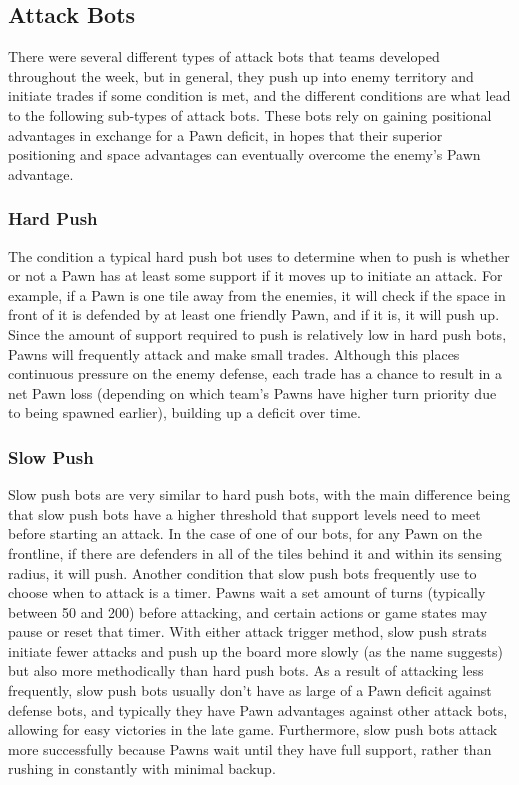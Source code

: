 \documentclass{article}
\begin{document}
\subsection{Attack Bots}
\hspace{\parindent}
There were several different types of attack bots that teams developed throughout the week, but in general, they push up into enemy territory and initiate trades if some condition is met, and the different conditions are what lead to the following sub-types of attack bots. These bots rely on gaining positional advantages in exchange for a Pawn deficit, in hopes that their superior positioning and space advantages can eventually overcome the enemy’s Pawn advantage.

\subsubsection{Hard Push}
\hspace{\parindent}
The condition a typical hard push bot uses to determine when to push is whether or not a Pawn has at least some support if it moves up to initiate an attack. For example, if a Pawn is one tile away from the enemies, it will check if the space in front of it is defended by at least one friendly Pawn, and if it is, it will push up. Since the amount of support required to push is relatively low in hard push bots, Pawns will frequently attack and make small trades. Although this places continuous pressure on the enemy defense, each trade has a chance to result in a net Pawn loss (depending on which team’s Pawns have higher turn priority due to being spawned earlier), building up a deficit over time.  

\subsubsection{Slow Push}
\hspace{\parindent}
Slow push bots are very similar to hard push bots, with the main difference being that slow push bots have a higher threshold that support levels need to meet before starting an attack. In the case of one of our bots, for any Pawn on the frontline, if there are defenders in all of the tiles behind it and within its sensing radius, it will push. Another condition that slow push bots frequently use to choose when to attack is a timer. Pawns wait a set amount of turns (typically between 50 and 200) before attacking, and certain actions or game states may pause or reset that timer. 
\bigbreak
With either attack trigger method, slow push strats initiate fewer attacks and push up the board more slowly (as the name suggests) but also more methodically than hard push bots. As a result of attacking less frequently, slow push bots usually don’t have as large of a Pawn deficit against defense bots, and typically they have Pawn advantages against other attack bots, allowing for easy victories in the late game. Furthermore, slow push bots attack more successfully because Pawns wait until they have full support, rather than rushing in constantly with minimal backup.
\end{document}

